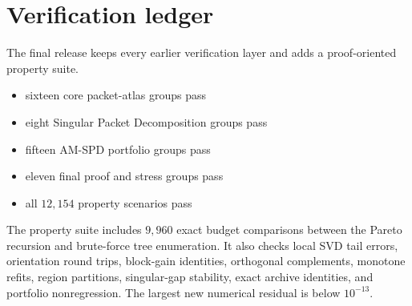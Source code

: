 \documentclass[11pt]{article}
\theoremstyle{definition}
\theoremstyle{remark}
\begin{document}
\appendix

\section{Verification ledger}
The final release keeps every earlier verification layer and adds a proof-oriented property suite.

\begin{itemize}
\item sixteen core packet-atlas groups pass
\item eight Singular Packet Decomposition groups pass
\item fifteen AM-SPD portfolio groups pass
\item eleven final proof and stress groups pass
\item all $12{,}154$ property scenarios pass
\end{itemize}

The property suite includes $9{,}960$ exact budget comparisons between the Pareto recursion and brute-force tree enumeration. It also checks local SVD tail errors, orientation round trips, block-gain identities, orthogonal complements, monotone refits, region partitions, singular-gap stability, exact archive identities, and portfolio nonregression. The largest new numerical residual is below $10^{-13}$.
\end{document}
